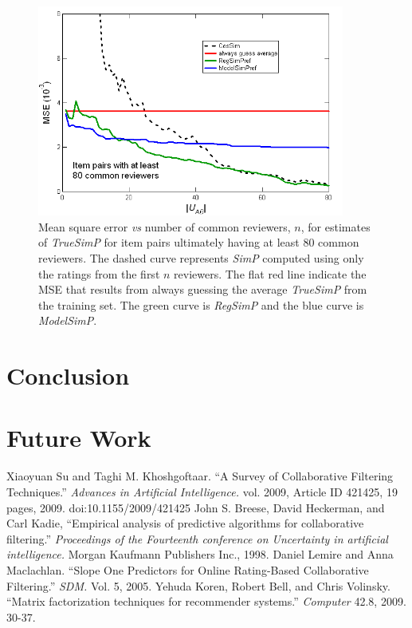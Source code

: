\documentclass[11pt]{article}
\begin{document}
\begin{figure}[!htbp]
    \centering
    \includegraphics[width=0.9\textwidth]{MSE_SimP_80.png}
	\caption{Mean square error {\em vs} number of common reviewers, $n$, for
estimates of {\em TrueSimP} for item pairs ultimately having at least 80 common
reviewers. The dashed curve represents
{\em SimP} computed using only the ratings from the first $n$ reviewers. The
flat red line indicate the MSE that results from always guessing the average
{\em TrueSimP} from the training set. The green curve is {\em RegSimP} and the
blue curve is {\em ModelSimP}. }
    \label{fig:MSE_SimP}
\end{figure}

\section*{Conclusion}
\section*{Future Work}

\begin{thebibliography}{9}

    Xiaoyuan Su and Taghi M. Khoshgoftaar.
    ``A Survey of Collaborative Filtering Techniques.''
    \emph{Advances in Artificial Intelligence.} vol. 2009,
    Article ID 421425, 19 pages, 2009. doi:10.1155/2009/421425
    John S. Breese, David Heckerman, and Carl Kadie, 
    ``Empirical analysis of predictive algorithms for collaborative filtering.'' 
    \emph{Proceedings of the Fourteenth conference on Uncertainty in artificial intelligence.}
    Morgan Kaufmann Publishers Inc., 1998.
    Daniel Lemire and Anna Maclachlan.
    ``Slope One Predictors for Online Rating-Based Collaborative Filtering.''
    \emph{SDM.} Vol. 5, 2005.
    Yehuda Koren, Robert Bell, and Chris Volinsky. 
    ``Matrix factorization techniques for recommender systems.''
    \emph{Computer} 42.8, 2009. 30-37.

\end{thebibliography}
\end{document}
